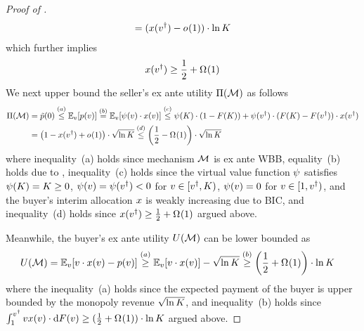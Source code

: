 \begin{proof}[Proof of ]
\begin{align*}
        =
        (x(v^\dagger) - o_{}(1))\cdot \ln K
    \end{align*}
    which further implies 
    \begin{align*}
        x(v^\dagger) \geq  \frac{1}{2} + \Omega_{}(1)
    \end{align*}
    We next upper bound the seller's ex ante utility $\Pi(\mathcal{M})$ as follows
    \begin{align*}
        \sellerexanteutil(\mech) &{} = 
        \sellerprice(0) \overset{(a)}{\leq} 
        \expect[\val]{\price(\val)}
        \overset{(b)}{=}
        \expect[\val]{\virtualval(\val)\cdot \alloc(\val)}
        \overset{(c)}{\leq} 
        \virtualval(\constantH)\cdot (1 - \buyercdf(\constantH))
        +
        \virtualval(\val\primed)\cdot (\buyercdf(\constantH) - \buyercdf(\val\primed)) \cdot \alloc(\val\primed)
        \\
        &{}
        =
        \left(1 - \alloc(\val\primed) + o_{}(1)\right)\cdot \sqrt{\ln\constantH}
        \overset{(d)}{\leq}
        \left(\frac{1}{2} - \Omega_{}(1)\right) \cdot \sqrt{\ln\constantH}
    \end{align*}
    where inequality~(a) holds since mechanism $\mathcal{M}$ is ex ante WBB, 
    equality~(b) holds due to ,
    inequality~(c) holds since the virtual value function $\psi$ satisfies $\psi(K) = K \geq 0$, $\psi(v) = \psi(v^\dagger) < 0$ for $v\in[v^\dagger,K)$, $\psi(v) = 0$ for $v\in[1, v^\dagger)$, and the buyer's interim allocation $x$ is weakly increasing due to BIC, and inequality~(d) holds since $x(v^\dagger) \geq \frac{1}{2} + \Omega_{}(1)$ argued above.
    
    Meanwhile, the buyer's ex ante utility $U(\mathcal{M})$ can be lower bounded as 
    \begin{align*}
        \buyerexanteutil(\mech) &{}= \expect[\val]{\val\cdot \alloc(\val) - \price(\val)}
        \overset{(a)}{\geq} \expect[\val]{\val\cdot \alloc(\val)} - \sqrt{\ln\constantH}
        \overset{(b)}{\geq}
        \left(\frac{1}{2} + \Omega_{}(1)\right)
        \cdot \ln\constantH
    \end{align*}
    where the inequality~(a) holds since the expected payment of the buyer is upper bounded by the monopoly revenue $\sqrt{\ln K}$, and inequality~(b) holds since $\int_1^{v^\dagger} vx(v)\cdot \mathrm{d} F(v) \geq (\frac{1}{2} + \Omega_{}(1)) \cdot \ln K$ argued above.


\end{proof}
